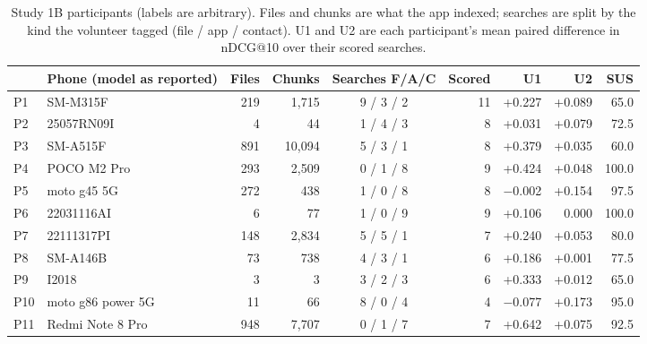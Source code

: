 \documentclass[pdflatex,sn-basic,Numbered]{sn-jnl}
\makeatletter
\newcommand{\ndcg}{nDCG@10}
\makeatother
\begin{document}
\begin{table}[tbp]
\centering\footnotesize\setlength{\tabcolsep}{3pt}
\caption{Study 1B participants (labels are arbitrary). Files and chunks are what the app indexed; searches are split by the kind the volunteer tagged (file / app / contact). U1 and U2 are each participant's mean paired difference in \ndcg{} over their scored searches.}
\label{tab:s1bpart}
\begin{tabular}{llrrcrrrr}
\toprule
 & Phone (model as reported) & Files & Chunks & Searches F/A/C & Scored & U1 & U2 & SUS \\
\midrule
P1 & SM-M315F & 219 & 1,715 & 9 / 3 / 2 & 11 & +0.227 & +0.089 & 65.0 \\
P2 & 25057RN09I & 4 & 44 & 1 / 4 / 3 & 8 & +0.031 & +0.079 & 72.5 \\
P3 & SM-A515F & 891 & 10,094 & 5 / 3 / 1 & 8 & +0.379 & +0.035 & 60.0 \\
P4 & POCO M2 Pro & 293 & 2,509 & 0 / 1 / 8 & 9 & +0.424 & +0.048 & 100.0 \\
P5 & moto g45 5G & 272 & 438 & 1 / 0 / 8 & 8 & $-$0.002 & +0.154 & 97.5 \\
P6 & 22031116AI & 6 & 77 & 1 / 0 / 9 & 9 & +0.106 & 0.000 & 100.0 \\
\midrule
P7\footnotemark[1] & 22111317PI & 148 & 2,834 & 5 / 5 / 1 & 7 & +0.240 & +0.053 & 80.0 \\
P8\footnotemark[1] & SM-A146B & 73 & 738 & 4 / 3 / 1 & 6 & +0.186 & +0.001 & 77.5 \\
P9\footnotemark[1] & I2018 & 3 & 3 & 3 / 2 / 3 & 6 & +0.333 & +0.012 & 65.0 \\
P10\footnotemark[1] & moto g86 power 5G & 11 & 66 & 8 / 0 / 4 & 4 & $-$0.077 & +0.173 & 95.0 \\
P11\footnotemark[1] & Redmi Note 8 Pro & 948 & 7,707 & 0 / 1 / 7 & 7 & +0.642 & +0.075 & 92.5 \\
\bottomrule
\end{tabular}
\end{table}
\end{document}
